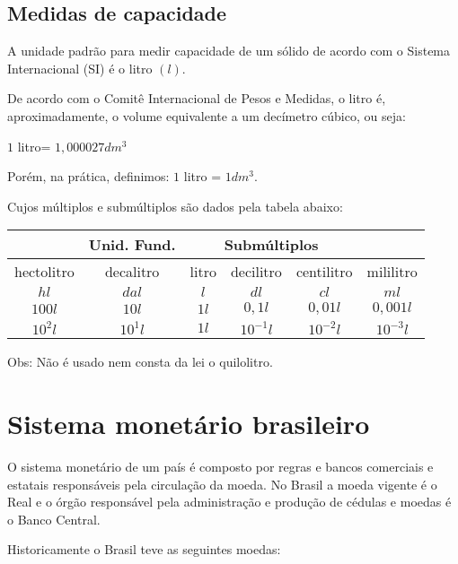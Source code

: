 \subsection{Medidas de capacidade}
A unidade padrão para medir capacidade de um sólido de acordo com o Sistema Internacional (SI) é o litro $(l)$.

De acordo com o Comitê Internacional de Pesos e Medidas, o litro é, aproximadamente, o volume equivalente a um decímetro cúbico, ou seja:

$1$ litro= $1,000027 dm^3$

Porém, na prática, definimos:
$1$ litro = $1 dm^3$.

Cujos múltiplos e submúltiplos são dados pela tabela abaixo:

 \begin{table}[H]
 \centering
 \begin{tabular}{|c|c|c|c|c|c|} \hline
 \rowcolor{cinza}
  \multicolumn{2}{|c|}{\textbf{Múltiplos}}
 & \multicolumn{1}{|c|}{\textbf{Unid. Fund.}} & \multicolumn{3}{|c|}{\textbf{Submúltiplos}} \\
 \hline
 hectolitro & decalitro & litro & decilitro & centilitro & mililitro \\
 \hline
 $hl$ & $dal$ & $l$ & $dl$ & $cl$ & $ml$ \\ \hline
 $100 l$ & $10 l$ & $1 l$ & $0,1 l$ & $0,01 l$ & $0,001 l$\\ \hline
 $10^2 l$ & $10^1 l$ & $1 l$ & $10^{-1} l$ & $10^{-2} l$ & $10^{-3} l$\\ \hline
 \end{tabular}
\end{table}

Obs: Não é usado nem consta da lei o quilolitro.



\section{Sistema monetário brasileiro}
O sistema monetário de um país é composto por regras e bancos comerciais e estatais responsáveis pela circulação da moeda. No Brasil a moeda vigente é o Real e o órgão responsável pela administração e produção de cédulas e moedas é o Banco Central.

Historicamente o Brasil teve as seguintes moedas:

